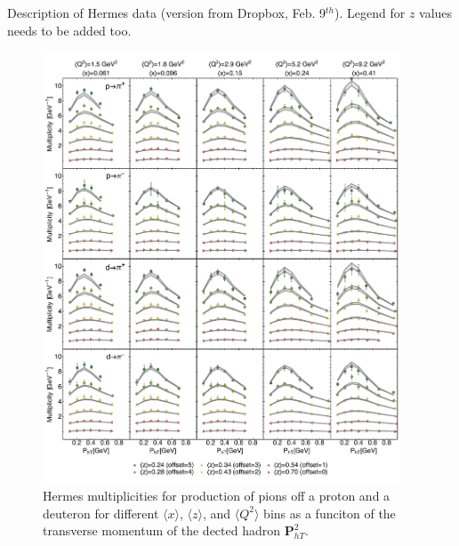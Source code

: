 \documentclass[aps,preprintnumbers,showpacs,nofootinbib,superscriptaddress,floatfix]{revtex4}
\begin{document}
Description of Hermes data (version from Dropbox, Feb. 9$^{th}$).
Legend for $z$ values needs to be added too.
\begin{figure}[h!]
\begin{center}
\includegraphics[width=0.95\textwidth]{plots/Hermes_Pions_SCIplot_flINDEP.pdf}
\end{center}
\caption{Hermes multiplicities for production of pions off a proton and a deuteron for different $\langle x \rangle$, $\langle z \rangle$, and $\langle Q^2 \rangle$ bins as a funciton of the transverse momentum of the dected hadron ${\bm P}_{hT}^ 2$.} 
\label{f:H_pions}
\end{figure}
\end{document}
